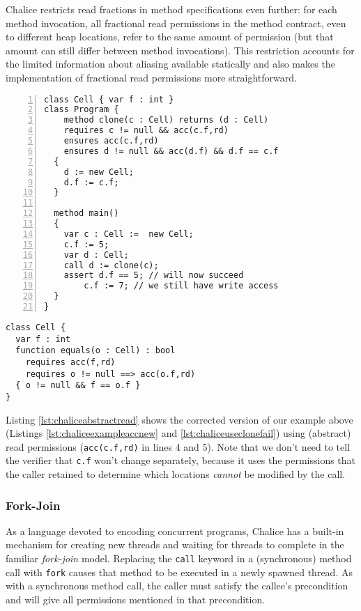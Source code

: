 Chalice restricts read fractions in method specifications even further: for each method invocation, all fractional read permissions in the method contract, even to different heap locations, refer to the same amount of permission (but that amount can still differ between method invocations).
This restriction accounts for the limited information about aliasing available statically and also makes the implementation of fractional read permissions more straightforward.


\begin{lstlisting}[language=Chalice,float,caption={Corrected example using abstract read permissions},label={lst:chaliceabstractread},numbers=left]
class Cell { var f : int }
class Program {
 	method clone(c : Cell) returns (d : Cell)
    requires c != null && acc(c.f,rd)
    ensures acc(c.f,rd)
    ensures d != null && acc(d.f) && d.f == c.f
  {
    d := new Cell;
    d.f := c.f;
  }

  method main()
  {
    var c : Cell :=  new Cell;
    c.f := 5;
    var d : Cell;
    call d := clone(c);
    assert d.f == 5; // will now succeed
		c.f := 7; // we still have write access
  }
}
\end{lstlisting}

\begin{lstlisting}[language=Chalice,float,caption={Alternative definition of \lstinline!Cell! using functions.},label={lst:chaliceequalsfunc}]
class Cell {
  var f : int
  function equals(o : Cell) : bool
    requires acc(f,rd)
    requires o != null ==> acc(o.f,rd)
  { o != null && f == o.f }
}
\end{lstlisting}

Listing \ref{lst:chaliceabstractread} shows the corrected version of our example above (Listings \ref{lst:chaliceexampleaccnew} and \ref{lst:chaliceuseclonefail}) using (abstract) read permissions (\lstinline!acc(c.f,rd)! in lines 4 and 5). 
Note that we don't need to tell the verifier that \lstinline!c.f! won't change separately, because it uses the permissions that the caller retained to determine which locations \emph{cannot} be modified by the call.

\subsubsection{Fork-Join}
As a language devoted to encoding concurrent programs, Chalice has a built-in mechanism for creating new threads and waiting for threads to complete in the familiar \emph{fork-join} model.
Replacing the \lstinline[language=Chalice]!call! keyword in a (synchronous) method call with \lstinline[language=Chalice]!fork! causes that method to be executed in a newly spawned thread.
As with a synchronous method call, the caller must satisfy the callee's precondition and will give all permissions mentioned in that precondition.

